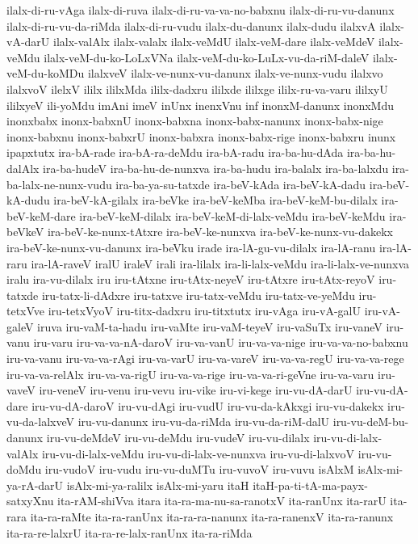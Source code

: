 {ilalx-di-ru-vAga
ilalx-di-ruva
ilalx-di-ru-va-va-no-babxnu
ilalx-di-ru-vu-danunx
ilalx-di-ru-vu-da-riMda
ilalx-di-ru-vudu
ilalx-du-danunx
ilalx-dudu
ilalxvA
ilalx-vA-darU
ilalx-valAlx
ilalx-valalx
ilalx-veMdU
ilalx-veM-dare
ilalx-veMdeV
ilalx-veMdu
ilalx-veM-du-ko-LoLxVNa
ilalx-veM-du-ko-LuLx-vu-da-riM-daleV
ilalx-veM-du-koMDu
ilalxveV
ilalx-ve-nunx-vu-danunx
ilalx-ve-nunx-vudu
ilalxvo
ilalxvoV
ilelxV
ililx
ililxMda
ililx-dadxru
ililxde
ililxge
ililx-ru-va-varu
ililxyU
ililxyeV
ili-yoMdu
imAni
imeV
inUnx
inenxVnu
inf
inonxM-danunx
inonxMdu
inonxbabx
inonx-babxnU
inonx-babxna
inonx-babx-nanunx
inonx-babx-nige
inonx-babxnu
inonx-babxrU
inonx-babxra
inonx-babx-rige
inonx-babxru
inunx
ipapxtutx
ira-bA-rade
ira-bA-ra-deMdu
ira-bA-radu
ira-ba-hu-dAda
ira-ba-hu-dalAlx
ira-ba-hudeV
ira-ba-hu-de-nunxva
ira-ba-hudu
ira-balalx
ira-ba-lalxdu
ira-ba-lalx-ne-nunx-vudu
ira-ba-ya-su-tatxde
ira-beV-kAda
ira-beV-kA-dadu
ira-beV-kA-dudu
ira-beV-kA-gilalx
ira-beVke
ira-beV-keMba
ira-beV-keM-bu-dilalx
ira-beV-keM-dare
ira-beV-keM-dilalx
ira-beV-keM-di-lalx-veMdu
ira-beV-keMdu
ira-beVkeV
ira-beV-ke-nunx-tAtxre
ira-beV-ke-nunxva
ira-beV-ke-nunx-vu-dakekx
ira-beV-ke-nunx-vu-danunx
ira-beVku
irade
ira-lA-gu-vu-dilalx
ira-lA-ranu
ira-lA-raru
ira-lA-raveV
iralU
iraleV
irali
ira-lilalx
ira-li-lalx-veMdu
ira-li-lalx-ve-nunxva
iralu
ira-vu-dilalx
iru
iru-tAtxne
iru-tAtx-neyeV
iru-tAtxre
iru-tAtx-reyoV
iru-tatxde
iru-tatx-li-dAdxre
iru-tatxve
iru-tatx-veMdu
iru-tatx-ve-yeMdu
iru-tetxVve
iru-tetxVyoV
iru-titx-dadxru
iru-titxtutx
iru-vAga
iru-vA-galU
iru-vA-galeV
iruva
iru-vaM-ta-hadu
iru-vaMte
iru-vaM-teyeV
iru-vaSuTx
iru-vaneV
iru-vanu
iru-varu
iru-va-va-nA-daroV
iru-va-vanU
iru-va-va-nige
iru-va-va-no-babxnu
iru-va-vanu
iru-va-va-rAgi
iru-va-varU
iru-va-vareV
iru-va-va-regU
iru-va-va-rege
iru-va-va-relAlx
iru-va-va-rigU
iru-va-va-rige
iru-va-va-ri-geVne
iru-va-varu
iru-vaveV
iru-veneV
iru-venu
iru-vevu
iru-vike
iru-vi-kege
iru-vu-dA-darU
iru-vu-dA-dare
iru-vu-dA-daroV
iru-vu-dAgi
iru-vudU
iru-vu-da-kAkxgi
iru-vu-dakekx
iru-vu-da-lalxveV
iru-vu-danunx
iru-vu-da-riMda
iru-vu-da-riM-dalU
iru-vu-deM-bu-danunx
iru-vu-deMdeV
iru-vu-deMdu
iru-vudeV
iru-vu-dilalx
iru-vu-di-lalx-valAlx
iru-vu-di-lalx-veMdu
iru-vu-di-lalx-ve-nunxva
iru-vu-di-lalxvoV
iru-vu-doMdu
iru-vudoV
iru-vudu
iru-vu-duMTu
iru-vuvoV
iru-vuvu
isAlxM
isAlx-mi-ya-rA-darU
isAlx-mi-ya-ralilx
isAlx-mi-yaru
itaH
itaH-pa-ti-tA-ma-payx-satxyXnu
ita-rAM-shiVva
itara
ita-ra-ma-nu-sa-ranotxV
ita-ranUnx
ita-rarU
ita-rara
ita-ra-raMte
ita-ra-ranUnx
ita-ra-ra-nanunx
ita-ra-ranenxV
ita-ra-ranunx
ita-ra-re-lalxrU
ita-ra-re-lalx-ranUnx
ita-ra-riMda
}
